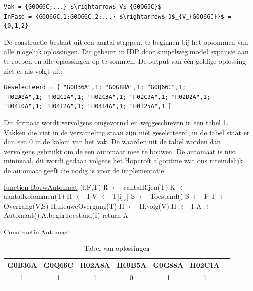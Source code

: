 \begin{lstlisting}[mathescape, caption=IDP Syntax conversion, frame=single]
Vak = {G0Q66C;...} $\rightarrow$ V$_{G0Q66C}$
InFase = {G0Q66C,1;G0Q66C,2;...} $\rightarrow$ D$_{V_{G0Q66C}}$ = {0,1,2}
\end{lstlisting}

De constructie bestaat uit een aantal stappen, te beginnen bij het opsommen van alle mogelijk oplossingen. Dit gebeurt in IDP door simpelweg model expansie aan te roepen en alle oplossingen op te sommen. De output van \'{e}\'{e}n geldige oplossing ziet er als volgt uit:
\begin{lstlisting}[mathescape, caption=IDP model, frame=single]
Geselecteerd = { "G0B36A",1; "G0G88A",1; "G0Q66C",1; 
"H02A8A",1; "H02C1A",1; "H02C3A",1; "H02C8A",1; "H02D2A",1;
"H04I0A",1; "H04I2A",1; "H04I4A",1; "H0T25A",1 }
\end{lstlisting}
Dit formaat wordt vervolgens omgevormd en weggeschreven in een tabel \ref{oplossingen}. Vakken die niet in de verzameling staan zijn niet geselecteerd, in de tabel staat er dan een 0 in de kolom van het vak. De waarden uit de tabel worden dan vervolgens gebruikt om de een automaat mee te bouwen. De automaat is niet minimaal, dit wordt gedaan volgens het Hopcroft algoritme wat ons uiteindelijk de automaat geeft die nodig is voor de implementatie.

\begin{algorithm}
	\underline{function BouwAutomaat} (I,F,T)\;
	R $\leftarrow$ aantalRijen(T) \;
	K $\leftarrow$ aantalKolommen(T) \;
	H $\leftarrow$ I \;
		{
			{
			V $\leftarrow$ T[i][j] \;
				{
					{
					S $\leftarrow$ Toestand() \;
					}
					{
					S $\leftarrow$ F \;
					}
				T $\leftarrow$ Overgang(V,S) \;
				H.nieuweOvergang(T) \;
				}
			H $\leftarrow$ H.volg(V) \;
			}
		H $\leftarrow$ I \;
		}
	A $\leftarrow$ Automaat() \;
	A.beginToestand(I) \;
	return A \;
	\caption{Constructie Automaat\label{alg:fsaConstruction}}
\end{algorithm}

\begin{table}[]
\centering
\caption{Tabel van oplossingen}
\label{oplossingen}
\begin{tabular}{|c|c|c|c|c|c|c}
\hline
G0B36A & G0Q66C & H02A8A & H09B5A & G0G88A & H02C1A &  \\ \hline
1 & 1 & 1 & 0 & 1 & 1 &  \\ \hline
 &  &  &  &  &  & 
\end{tabular}
\end{table}

